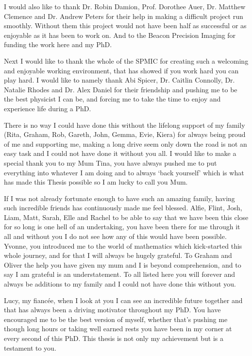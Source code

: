 \documentclass[12pt]{report}
\begin{document}
I would also like to thank Dr. Robin Damion, Prof. Dorothee Auer, Dr. Matthew Clemence and Dr. Andrew Peters for their help in making a difficult project run smoothly. Without them this project would not have been half as successful or as enjoyable as it has been to work on. And to the Beacon Precision Imaging for funding the work here and my PhD.

Next I would like to thank the whole of the SPMIC for creating such a welcoming and enjoyable working environment, that has showed if you work hard you can play hard. I would like to namely thank Abi Spicer, Dr. Caitlin Connolly, Dr. Natalie Rhodes and Dr. Alex Daniel for their friendship and pushing me to be the best physicist I can be, and forcing me to take the time to enjoy and experience life during a PhD.

There is no way I could have done this without the lifelong support of my family (Rita, Graham, Rob, Gareth, John, Gemma, Evie, Kiera) for always being proud of me and supporting me, making a long drive seem only down the road is not an easy task and I could not have done it without you all. I would like to make a special thank you to my Mum Tina, you have always pushed me to put everything into whatever I am doing and to always `back yourself' which is what has made this Thesis possible so I am lucky to call you Mum.

If I was not already fortunate enough to have such an amazing family, having such incredible friends has continuously made me feel blessed. Alfie, Flint, Josh, Liam, Matt, Sarah, Elle and Rachel to be able to say that we have been this close for so long is one hell of an undertaking, you have been there for me through it all and without you I do not see how any of this would have been possible. Yvonne, you introduced me to the world of mathematics which kick-started this whole journey, and for that I will always be hugely grateful. To Graham and Oliver the help you have given my mum and I is beyond comprehension, and to say I am grateful is an understatement. To all listed here you will forever and always be additions to my family and I could not have done this without you. 

Lucy, my fianc\'ee, when I look at you I can see an incredible future together and that has always been a driving motivator throughout my PhD. You have encouraged me to be the best version of myself, whether that's pushing me though long hours or taking well earned rests you have been in my corner at every second of this PhD. This thesis is not only my achievement but is a testament to you.
\end{document}
